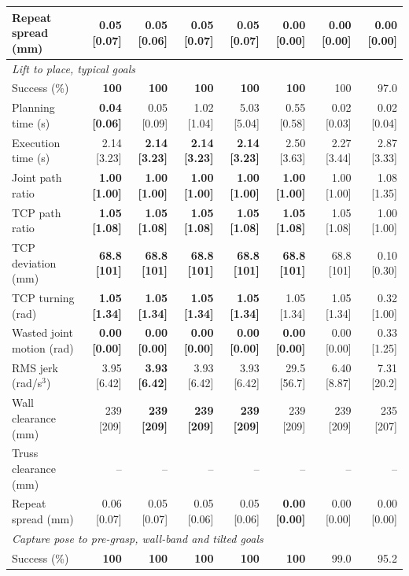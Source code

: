 \begin{table}[t]
\begin{tabular}{lrrrrrrr}
Repeat spread (mm) & 0.05 [0.07] & 0.05 [0.06] & 0.05 [0.07] & 0.05 [0.07] & \textbf{0.00 [0.00]} & 0.00 [0.00] & 0.00 [0.00] \\
\midrule
\multicolumn{8}{l}{\emph{Lift to place, typical goals}} \\
Success (\%) & \textbf{100} & \textbf{100} & \textbf{100} & \textbf{100} & \textbf{100} & 100 & 97.0 \\
Planning time (s) & \textbf{0.04 [0.06]} & 0.05 [0.09] & 1.02 [1.04] & 5.03 [5.04] & 0.55 [0.58] & 0.02 [0.03] & 0.02 [0.04] \\
Execution time (s) & 2.14 [3.23] & \textbf{2.14 [3.23]} & \textbf{2.14 [3.23]} & \textbf{2.14 [3.23]} & 2.50 [3.63] & 2.27 [3.44] & 2.87 [3.33] \\
Joint path ratio & \textbf{1.00 [1.00]} & \textbf{1.00 [1.00]} & \textbf{1.00 [1.00]} & \textbf{1.00 [1.00]} & \textbf{1.00 [1.00]} & 1.00 [1.00] & 1.08 [1.35] \\
TCP path ratio & \textbf{1.05 [1.08]} & \textbf{1.05 [1.08]} & \textbf{1.05 [1.08]} & \textbf{1.05 [1.08]} & \textbf{1.05 [1.08]} & 1.05 [1.08] & 1.00 [1.00] \\
TCP deviation (mm) & \textbf{68.8 [101]} & \textbf{68.8 [101]} & \textbf{68.8 [101]} & \textbf{68.8 [101]} & \textbf{68.8 [101]} & 68.8 [101] & 0.10 [0.30] \\
TCP turning (rad) & \textbf{1.05 [1.34]} & \textbf{1.05 [1.34]} & \textbf{1.05 [1.34]} & \textbf{1.05 [1.34]} & 1.05 [1.34] & 1.05 [1.34] & 0.32 [1.00] \\
Wasted joint motion (rad) & \textbf{0.00 [0.00]} & \textbf{0.00 [0.00]} & \textbf{0.00 [0.00]} & \textbf{0.00 [0.00]} & \textbf{0.00 [0.00]} & 0.00 [0.00] & 0.33 [1.25] \\
RMS jerk (rad/s$^3$) & 3.95 [6.42] & \textbf{3.93 [6.42]} & 3.93 [6.42] & 3.93 [6.42] & 29.5 [56.7] & 6.40 [8.87] & 7.31 [20.2] \\
Wall clearance (mm) & 239 [209] & \textbf{239 [209]} & \textbf{239 [209]} & \textbf{239 [209]} & 239 [209] & 239 [209] & 235 [207] \\
Truss clearance (mm) & -- & -- & -- & -- & -- & -- & -- \\
Repeat spread (mm) & 0.06 [0.07] & 0.05 [0.07] & 0.05 [0.06] & 0.05 [0.06] & \textbf{0.00 [0.00]} & 0.00 [0.00] & 0.00 [0.00] \\
\midrule
\multicolumn{8}{l}{\emph{Capture pose to pre-grasp, wall-band and tilted goals}} \\
Success (\%) & \textbf{100} & \textbf{100} & \textbf{100} & \textbf{100} & \textbf{100} & 99.0 & 95.2 \\

\end{tabular}
\end{table}

